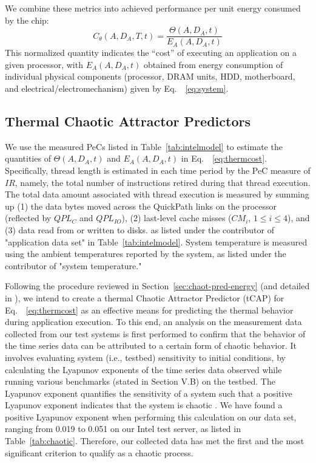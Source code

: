 \documentclass[times, 10pt,twocolumn]{IEEEtran}
\newcommand{\equationname}{Eq.\ }
\newcommand{\equationnames}{Eq.\ }
\begin{document}
We combine these metrics into achieved performance per unit energy
consumed by the chip:
\begin{equation}
\label{eq:thermcost} C_{\theta}(A, D_{A}, T, t)=\frac{\Theta (A, D_{A}, t)}{E_{A}(A, D_{A}, t)}
\end{equation}
This normalized quantity indicates the ``cost'' of executing an
application on a given processor, with $E_{A}(A, D_{A}, t)$ obtained
from energy consumption of individual physical components (processor,
DRAM units, HDD, motherboard, and electrical/electromechanism) given by
\equationname~\eqref{eq:system}.

\subsection{Thermal Chaotic Attractor Predictors}
\label{sec:therm-chaot-attr} 
We use the measured PeCs listed in Table~\ref{tab:intelmodel} to
estimate the quantities of $\Theta(A, D_{A}, t)$ and $E_{A}(A, D_{A},
t)$ in \equationname~\eqref{eq:thermcost}.  Specifically, thread length
is estimated in each time period by the PeC measure of $IR$, namely, the
total number of instructions retired during that thread execution.  The
total data amount associated with thread execution is measured by
summing up (1) the data bytes moved across the QuickPath links on the
processor (reflected by $QPL_{C}$ and $QPL_{IO}$), (2) last-level cache
misses ($CM_{i}$, $1\leq i \leq 4$), and (3) data read from or written
to disks.  as listed under the contributor of "application data set" in
Table~\ref{tab:intelmodel}.  System temperature is measured using the
ambient temperatures reported by the system, as listed under the
contributor of "system temperature."

Following the procedure reviewed in Section~\ref{sec:chaot-pred-energy}
(and detailed in \cite{Lewis2010}), we intend to create a thermal
Chaotic Attractor Predictor (tCAP) for
\equationnames~\eqref{eq:thermcost} as an effective means for predicting
the thermal behavior during application execution.  To this end, an
analysis on the measurement data collected from our test systems is
first performed to confirm that the behavior of the time series data can
be attributed to a certain form of chaotic behavior.  It involves
evaluating system (i.e., testbed) sensitivity to initial conditions, by
calculating the Lyapunov exponents of the time series data observed
while running various benchmarks (stated in Section V.B) on the testbed.
The Lyapunov exponent quantifies the sensitivity of a system such that a
positive Lyapunov exponent indicates that the system is chaotic
\cite{Sprott2003}.  We have found a positive Lyapunov exponent when
performing this calculation on our data set, ranging from 0.019 to 0.051
on our Intel test server, as listed in Table~\ref{tab:chaotic}.
Therefore, our collected data has met the first and the most significant
criterion to qualify as a chaotic process.
\end{document}
